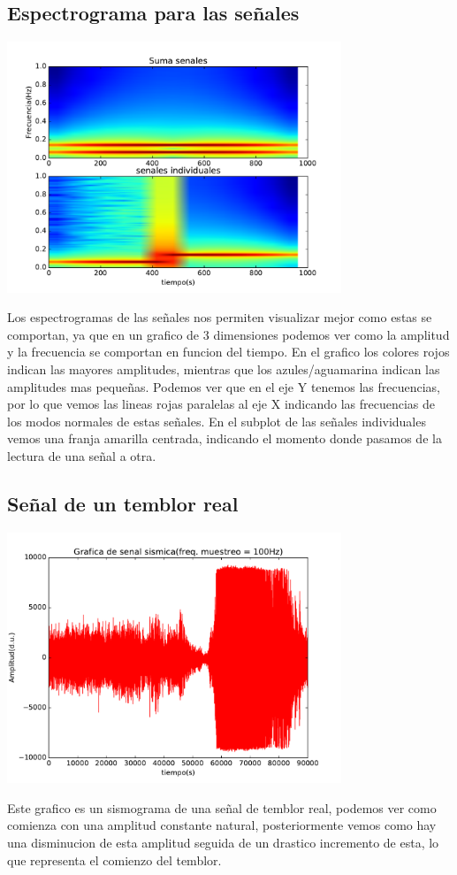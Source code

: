 \documentclass[11pt,letterpaper]{exam}
\begin{document}
\subsection{Espectrograma para las señales}
\begin{center}
\includegraphics[width=10cm]{espectrogramas1.pdf} 
\end{center}
Los espectrogramas de las señales nos permiten visualizar mejor como estas se comportan, ya que en un grafico de 3 dimensiones podemos ver como la amplitud y la frecuencia se comportan en funcion del tiempo. En el grafico los colores rojos indican las mayores amplitudes, mientras que los azules/aguamarina indican las amplitudes mas pequeñas. Podemos ver que en el eje Y tenemos las frecuencias, por lo que vemos las lineas rojas paralelas al eje X indicando las frecuencias de los modos normales de estas señales. En el subplot de las señales individuales vemos una franja amarilla centrada, indicando el momento donde pasamos de la lectura de una señal a otra.

\subsection{Señal de un temblor real}
\begin{center}
\includegraphics[width=10cm]{temblor.pdf} 
\end{center}
Este grafico es un sismograma de una señal de temblor real, podemos ver como comienza con una amplitud constante natural, posteriormente vemos como hay una disminucion de esta amplitud seguida de un drastico incremento de esta, lo que representa el comienzo del temblor.
\end{document}

